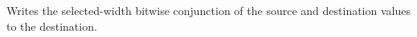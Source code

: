 Writes the selected-width bitwise conjunction of the source and destination values to the destination.
